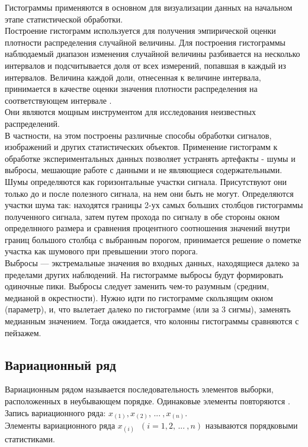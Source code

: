 Гистограммы применяются в основном для визуализации данных на начальном этапе статистической обработки.\\
Построение гистограмм используется для получения эмпирической оценки плотности распределения случайной величины. Для построения гистограммы наблюдаемый диапазон изменения случайной величины разбивается на несколько интервалов и подсчитывается доля от всех измерений, попавшая в каждый из интервалов. Величина каждой доли, отнесенная к величине интервала, принимается в качестве оценки значения плотности распределения на соответствующем интервале \cite{s:hist}.\\
Они являются мощным инструментом для исследования неизвестных распределений.\\
В частности, на этом построены различные способы обработки сигналов, изображений и других статистических объектов. Применение гистограмм к обработке экспериментальных данных позволяет устранять артефакты - шумы и выбросы, мешающие работе с данными и не являющиеся содержательными. \\
Шумы определяются как горизонтальные участки сигнала. Присутствуют они только до и
после полезного сигнала, на нем они быть не могут. Определяются участки шума так: находятся границы 2-ух самых больших столбцов гистограммы полученного сигнала, затем путем прохода по сигналу в обе стороны окном определнного размера и сравнения процентного соотношения значений внутри границ большого столбца с выбранным порогом, принимается решение о пометке участка как шумового при превышении этого порога.\\
Выбросы —  экстремальные значения во входных данных, находящиеся далеко за пределами других наблюдений. На гистограмме выбросы будут формировать одиночные пики. Выбросы следует заменить чем-то разумным (средним, медианой в окрестности). Нужно идти по гистограмме скользящим окном (параметр), и, что вылетает далеко по гистограмме (или за 3 сигмы), заменять медианным значением. Тогда ожидается, что колонны гистограммы сравняются с пейзажем.


\subsection{Вариационный ряд}

Вариационным рядом называется последовательность элементов выборки, расположенных в неубывающем порядке. Одинаковые элементы повторяются \cite[с. 409]{b:probSectMath}.\\
Запись вариационного ряда: $x_{(1)}, x_{(2)}, \, ... \: , x_{(n)}$.\\
Элементы вариационного ряда $x_{(i)} \;\; (i = 1, 2, \, ... \: , n)$ называются порядковыми статистиками.

